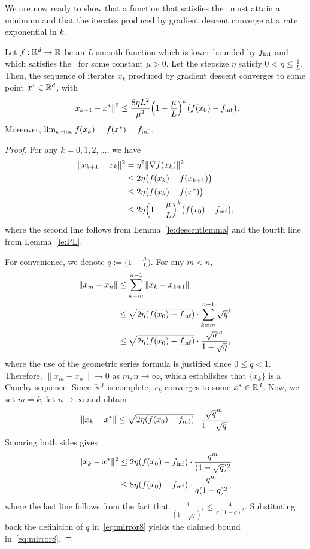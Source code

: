 We are now ready to show that  a function that satisfies the \PLC\ must attain a minimum and
that the iterates produced by gradient descent converge at a rate exponential in $k$.


\begin{theorem}\label{th:PLCbound}
Let $f: \mathbb{R}^d \to \mathbb{R}$ be an $L$-smooth function which is lower-bounded by ${f_{\inf}}$ and which satisfies the \PLC\ for some constant $\mu > 0$. Let the stepsize $\eta$ satisfy $0 < \eta \le \frac{1}{L}$. Then, the sequence of iterates $x_k$ produced by gradient descent converges to some point $x^* \in \mathbb{R}^d$, with
\begin{equation}\label{eq:mirror7}
\|x_{k+1} - x^*\|^2 \le \frac{8 \eta L^2}{\mu^2}  
\Big(1-\frac{\mu}{L}\Big)^k \big( f(x_0) - {f_{\inf}} \big).
\end{equation}
Moreover, 
$\lim_{k \to \infty} f(x_k) = f(x^*) = {f_{\inf}}$.
\end{theorem}

\begin{proof}
For any $k=0,1,2,\dots$, we have
\begin{align*}
\|x_{k+1} - x_k \|^2 & = \eta^2 \|\nabla f(x_k)\|^2 \\
& \le 2 \eta \big(f(x_k) - f(x_{k+1})\big) \\
& \le 2 \eta \big(f(x_k) - f(x^*)\big) \\
& \le 2 \eta \Big(1-\frac{\mu}{L}\Big)^k \big( f(x_0) - {f_{\inf}} \big),
\end{align*}
where the second line follows from Lemma~\ref{le:descentlemma}
and the fourth line from Lemma~\ref{le:PL}. 

For convenience, we denote $q:=\Big(1-\frac{\mu}{L}\Big)$.
For any $m < n$,
\begin{align*}
\|x_m - x_n\| & \le \sum_{k=m}^{n-1}\|x_k - x_{k+1}\| \\
              & \le \sqrt{2\eta(f(x_0) - {f_{\inf}})} \cdot \sum_{k=m}^{n-1} \sqrt{q}^k \\
              & \le \sqrt{2\eta(f(x_0) - {f_{\inf}})} \cdot \frac{\sqrt{q}^m}{1-\sqrt{q}},
\end{align*}
where the use of the geometric series formula is justified since  $0 \le q < 1$.
Therefore, $\|x_m - x_n\| \to 0$ as $m,n\to \infty$, which establishes that $\{x_k\}$ is a Cauchy sequence. Since $\mathbb{R}^d$ is complete, 
$x_k$ converges to some $x^* \in \mathbb{R}^d$. Now, we set $m=k$, let $n \to \infty$ and obtain
$$
\|x_k - x^*\| \le \sqrt{2\eta(f(x_0) - {f_{\inf}})} \cdot \frac{\sqrt{q}^m}{1-\sqrt{q}}.
$$
Squaring both sides gives
\begin{align}
\|x_k - x^*\|^2 & \le 2\eta(f(x_0) - {f_{\inf}}) \cdot \frac{q^m}{(1-\sqrt{q})^2} \notag \\
& \le 8\eta(f(x_0) - {f_{\inf}}) \cdot \frac{q^m}{q(1-q)^2}, \label{eq:mirror8}
\end{align}
where the last line follows from the fact that 
$\frac{1}{(1-\sqrt{q})^2} \le \frac{4}{q(1-q)^2}$.
Substituting back the definition of $q$ in~\eqref{eq:mirror8} yields the claimed bound in~\eqref{eq:mirror8}.

\end{proof}

